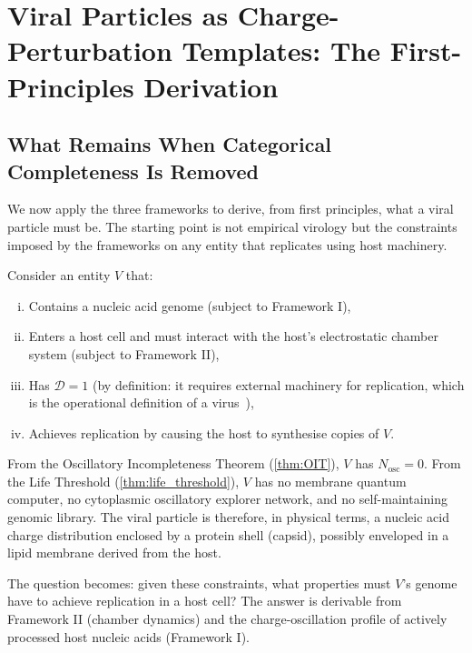 \documentclass[12pt,a4paper]{article}
\theoremstyle{definition}
\theoremstyle{remark}
\newcommand{\Nosc}{N_{\mathrm{osc}}}
\newcommand{\Dcat}{\mathcal{D}}
\begin{document}
\section{Viral Particles as Charge-Perturbation Templates: The First-Principles Derivation}
\label{sec:viral_template}

\subsection{What Remains When Categorical Completeness Is Removed}

We now apply the three frameworks to derive, from first principles, what a viral particle must be. The starting point is not empirical virology but the constraints imposed by the frameworks on any entity that replicates using host machinery.

Consider an entity $V$ that:
\begin{enumerate}[(i)]
  \item Contains a nucleic acid genome (subject to Framework I),
  \item Enters a host cell and must interact with the host's electrostatic chamber system (subject to Framework II),
  \item Has $\Dcat = 1$ (by definition: it requires external machinery for replication, which is the operational definition of a virus~\cite{Lwoff1957,Baltimore1971}),
  \item Achieves replication by causing the host to synthesise copies of $V$.
\end{enumerate}

From the Oscillatory Incompleteness Theorem (\cref{thm:OIT}), $V$ has $\Nosc = 0$. From the Life Threshold (\cref{thm:life_threshold}), $V$ has no membrane quantum computer, no cytoplasmic oscillatory explorer network, and no self-maintaining genomic library. The viral particle is therefore, in physical terms, a nucleic acid charge distribution enclosed by a protein shell (capsid), possibly enveloped in a lipid membrane derived from the host.

The question becomes: given these constraints, what properties must $V$'s genome have to achieve replication in a host cell? The answer is derivable from Framework II (chamber dynamics) and the charge-oscillation profile of actively processed host nucleic acids (Framework I).
\end{document}

